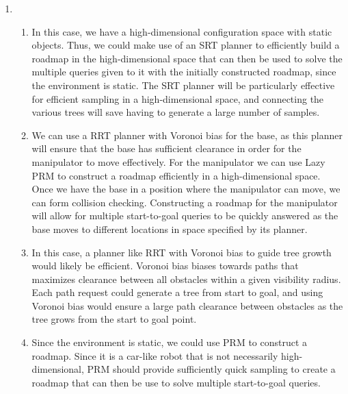 \documentclass[11pt]{article}
\begin{document}
\begin{enumerate}[leftmargin=0.3in]
   \item %
   \begin{enumerate}
       \item In this case, we have a high-dimensional configuration space with static objects. Thus, we could make use of an SRT planner to efficiently build a roadmap in the high-dimensional space that can then be used to solve the multiple queries given to it with the initially constructed roadmap, since the environment is static. The SRT planner will be particularly effective for efficient sampling in a high-dimensional space, and connecting the various trees will save having to generate a large number of samples. 
       \item We can use a RRT planner with Voronoi bias for the base, as this planner will ensure that the base has sufficient clearance in order for the manipulator to move effectively. For the manipulator we can use Lazy PRM to construct a roadmap efficiently in a high-dimensional space. Once we have the base in a position where the manipulator can move, we can form collision checking. Constructing a roadmap for the manipulator will allow for multiple start-to-goal queries to be quickly answered as the base moves to different locations in space specified by its planner. 
       \item In this case, a planner like RRT with Voronoi bias to guide tree growth would likely be efficient. Voronoi bias biases towards paths that maximizes clearance between all obstacles within a given visibility radius. Each path request could generate a tree from start to goal, and using Voronoi bias would ensure a large path clearance between obstacles as the tree grows from the start to goal point.
       \item Since the environment is static, we could use PRM to construct a roadmap. Since it is a car-like robot that is not necessarily high-dimensional, PRM should provide sufficiently quick sampling to create a roadmap that can then be use to solve multiple start-to-goal queries. 
   \end{enumerate} %

\end{enumerate}
\end{document}
